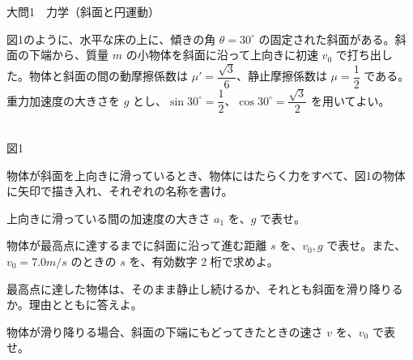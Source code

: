 \documentclass[paper=b5, fontsize=8pt, fleqn, twoside]{jlreq}
\begin{document}
\begin{ascolorbox4A}[75点・30分]{大問1　力学（斜面と円運動）}
\par\noindent
\begin{minipage}[t]{0.50\linewidth}\vspace{0pt}
図1のように、水平な床の上に、傾きの角 $\theta=30^\circ$ の固定された斜面がある。斜面の下端から、質量 $m$ の小物体を斜面に沿って上向きに初速 $v_0$ で打ち出した。物体と斜面の間の動摩擦係数は $\mu'=\dfrac{\sqrt{3}}{6}$、静止摩擦係数は $\mu=\dfrac{1}{2}$ である。重力加速度の大きさを $g$ とし、$\sin30^\circ=\dfrac{1}{2}$、$\cos30^\circ=\dfrac{\sqrt{3}}{2}$ を用いてよい。
\end{minipage}\hfill
\begin{minipage}[t]{0.47\linewidth}\vspace{0pt}\centering
{}\\[1pt]{\small 図1}
\end{minipage}
\begin{qlist}[series=ta]
\item 物体が斜面を上向きに滑っているとき、物体にはたらく力をすべて、図1の物体に矢印で描き入れ、それぞれの名称を書け。
\item 上向きに滑っている間の加速度の大きさ $a_1$ を、$g$ で表せ。
\item 物体が最高点に達するまでに斜面に沿って進む距離 $s$ を、$v_0,g$ で表せ。また、$v_0=7.0\unit{m/s}$ のときの $s$ を、有効数字 2 桁で求めよ。
\item 最高点に達した物体は、そのまま静止し続けるか、それとも斜面を滑り降りるか。理由とともに答えよ。
\item 物体が滑り降りる場合、斜面の下端にもどってきたときの速さ $v$ を、$v_0$ で表せ。
\end{qlist}

\end{ascolorbox4A}
\end{document}

